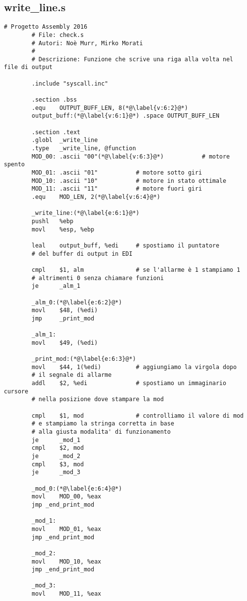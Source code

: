 \documentclass[a4paper,11pt]{article}
\begin{document}
		\subsection{write\_line.s}
		\begin{lstlisting}[language=MyAssembler, style=MyAsm]
		# Progetto Assembly 2016
		# File: check.s
		# Autori: Noè Murr, Mirko Morati
		#
		# Descrizione: Funzione che scrive una riga alla volta nel file di output
		
		.include "syscall.inc"
		
		.section .bss
		.equ	OUTPUT_BUFF_LEN, 8(*@\label{v:6:2}@*)
		output_buff:(*@\label{v:6:1}@*) .space OUTPUT_BUFF_LEN
		
		.section .text
		.globl  _write_line
		.type   _write_line, @function
		MOD_00: .ascii "00"(*@\label{v:6:3}@*)           # motore spento
		MOD_01: .ascii "01"           # motore sotto giri
		MOD_10: .ascii "10"           # motore in stato ottimale
		MOD_11: .ascii "11"           # motore fuori giri
		.equ 	MOD_LEN, 2(*@\label{v:6:4}@*)
		
		_write_line:(*@\label{e:6:1}@*)
		pushl   %ebp
		movl    %esp, %ebp
		
		leal    output_buff, %edi     # spostiamo il puntatore
		# del buffer di output in EDI
		
		cmpl    $1, alm               # se l'allarme è 1 stampiamo 1
		# altrimenti 0 senza chiamare funzioni
		je      _alm_1
		
		_alm_0:(*@\label{e:6:2}@*)
		movl    $48, (%edi)
		jmp     _print_mod
		
		_alm_1:
		movl    $49, (%edi)
		
		_print_mod:(*@\label{e:6:3}@*)
		movl    $44, 1(%edi)          # aggiungiamo la virgola dopo
		# il segnale di allarme
		addl    $2, %edi              # spostiamo un immaginario cursore
		# nella posizione dove stampare la mod
		
		cmpl    $1, mod               # controlliamo il valore di mod
		# e stampiamo la stringa corretta in base
		# alla giusta modalita' di funzionamento
		je      _mod_1
		cmpl    $2, mod
		je      _mod_2
		cmpl    $3, mod
		je      _mod_3
		
		_mod_0:(*@\label{e:6:4}@*)
		movl    MOD_00, %eax
		jmp _end_print_mod
		
		_mod_1:
		movl    MOD_01, %eax
		jmp _end_print_mod
		
		_mod_2:
		movl    MOD_10, %eax
		jmp _end_print_mod
		
		_mod_3:
		movl    MOD_11, %eax
		

\end{lstlisting}
\end{document}
